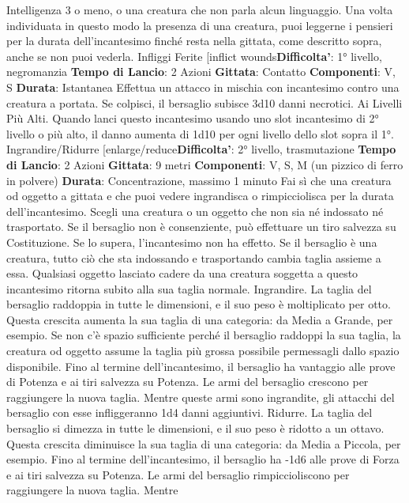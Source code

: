 \begin{multicols}{2}
Intelligenza 3 o meno, o una creatura che non parla
alcun linguaggio.
Una volta individuata in questo modo la presenza di
una creatura, puoi leggerne i pensieri per la durata
dell’incantesimo finché resta nella gittata, come
descritto sopra, anche se non puoi vederla.
Infliggi Ferite
[inflict wounds\textbf{Difficolta'}:
1° livello, negromanzia
\textbf{Tempo di Lancio}: 2 Azioni
\textbf{Gittata}: Contatto
\textbf{Componenti}: V, S
\textbf{Durata}: Istantanea
Effettua un attacco in mischia con incantesimo contro
una creatura a portata. Se colpisci, il bersaglio subisce
3d10 danni necrotici.
Ai Livelli Più Alti. Quando lanci questo incantesimo
usando uno slot incantesimo di 2° livello o più alto, il
danno aumenta di 1d10 per ogni livello dello slot sopra
il 1°.
Ingrandire/Ridurre
[enlarge/reduce\textbf{Difficolta'}:
2° livello, trasmutazione
\textbf{Tempo di Lancio}: 2 Azioni
\textbf{Gittata}: 9 metri
\textbf{Componenti}: V, S, M (un pizzico di ferro in polvere)
\textbf{Durata}: Concentrazione, massimo 1 minuto
Fai sì che una creatura od oggetto a gittata e che puoi
vedere ingrandisca o rimpicciolisca per la durata
dell’incantesimo. Scegli una creatura o un oggetto che
non sia né indossato né trasportato. Se il bersaglio non
è consenziente, può effettuare un tiro salvezza su
Costituzione. Se lo supera, l’incantesimo non ha effetto.
Se il bersaglio è una creatura, tutto ciò che sta
indossando e trasportando cambia taglia assieme a
essa. Qualsiasi oggetto lasciato cadere da una creatura
soggetta a questo incantesimo ritorna subito alla sua
taglia normale.
Ingrandire. La taglia del bersaglio raddoppia in tutte le
dimensioni, e il suo peso è moltiplicato per otto. Questa
crescita aumenta la sua taglia di una categoria: da
Media a Grande, per esempio. Se non c’è spazio
sufficiente perché il bersaglio raddoppi la sua taglia, la
creatura od oggetto assume la taglia più grossa
possibile permessagli dallo spazio disponibile. Fino al
termine dell’incantesimo, il bersaglio ha vantaggio alle
prove di Potenza e ai tiri salvezza su Potenza. Le armi del
bersaglio crescono per raggiungere la nuova taglia.
Mentre queste armi sono ingrandite, gli attacchi del
bersaglio con esse infliggeranno 1d4 danni aggiuntivi.
Ridurre. La taglia del bersaglio si dimezza in tutte le
dimensioni, e il suo peso è ridotto a un ottavo. Questa
crescita diminuisce la sua taglia di una categoria: da
Media a Piccola, per esempio. Fino al termine
dell’incantesimo, il bersaglio ha -1d6 alle prove di
Forza e ai tiri salvezza su Potenza. Le armi del bersaglio
rimpiccioliscono per raggiungere la nuova taglia. Mentre

\end{multicols}
